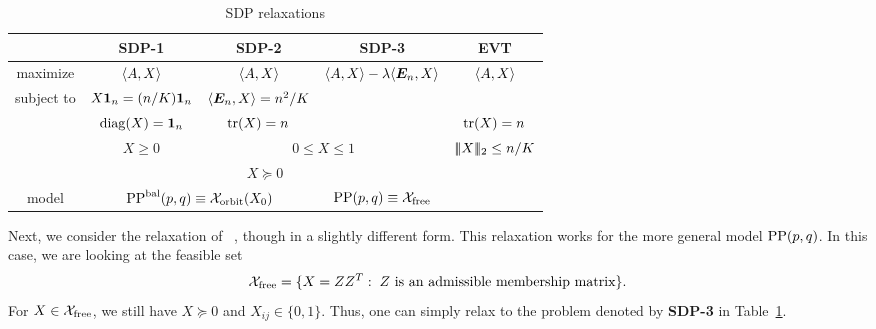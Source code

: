 \begin{table}[t]
\caption{SDP relaxations}
\label{SDP-table}
\renewcommand{\arraystretch}{1.3}
\small
\begin{center}
\begin{tabular}{c|c|c|c|c}
& SDP-1 & SDP-2 & SDP-3 & EVT \\ \hline
maximize & $\langle A,X\rangle$ & $\langle A,X\rangle$ & 
    $\langle A,X\rangle - \lambda\langle \bm{E}_n,X\rangle$ & $\langle A,X\rangle$
\\ \hline 
\multirow{3}{*}{subject to} & $X \bm{1}_n = (n/K) \bm{1}_n$ 
     &  $\langle \bm{E}_n,X\rangle = n^2/K$ & \\
     & $\operatorname{diag}(X)=\bm{1}_n$ & $\operatorname*{tr}(X) = n$ &  & $\operatorname*{tr}(X) = n$
\\ \cline{2-5}
     &  $X \ge 0$ & \multicolumn{2}{c|}{$0 \le X \le 1$} & $|\!|\!|X|\!|\!| _2\le n/K$
\\ \cline{2-5}
     & \multicolumn{3}{c}{$X \succeq 0$} 
\\ \hline

    model & \multicolumn{2}{c|}{$\text{PP}^{\text{bal}}(p,q) \equiv \mathcal{X}_{\text{orbit}}{(}X_0)$} 
    & $\text{PP}(p,q) \equiv \mathcal{X}_{\text{free}}$
\end{tabular}
\end{center}
\end{table}


Next, we consider the relaxation of \CaiLi~\cite{Cai2014}, though in a
slightly different form.  This relaxation works for the more general model $\text{PP}(p,q)$. In this case, we are looking at the feasible set
\begin{align}\label{eq:Xfree}
	\mathcal{X}_{\text{free}} = \{X = ZZ^T: \; \text{$Z$ is an admissible membership matrix} \}.
\end{align}
For $X \in \mathcal{X}_{\text{free}}$, we still have $X \succeq 0$ and $X_{ij} \in
\{0,1\}$. Thus, one can simply relax to the problem denoted by {\bf SDP-3} in Table~\ref{SDP-table}.

